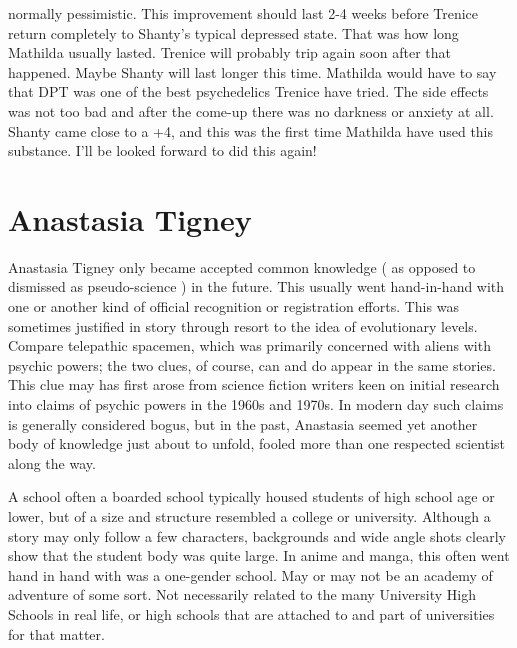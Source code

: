 \documentclass[12pt]{book}
\begin{document}
normally pessimistic. This improvement should last 2-4 weeks before Trenice return completely to Shanty's typical depressed state. That was how long Mathilda usually lasted. Trenice will probably trip again soon after that happened. Maybe Shanty will last longer this time. Mathilda would have to say that DPT was one of the best psychedelics Trenice have tried. The side effects was not too bad and after the come-up there was no darkness or anxiety at all. Shanty came close to a +4, and this was the first time Mathilda have used this substance. I'll be looked forward to did this again!



\chapter{Anastasia Tigney}

Anastasia Tigney only became accepted common knowledge ( as opposed to dismissed as pseudo-science ) in the future. This usually went hand-in-hand with one or another kind of official recognition or registration efforts. This was sometimes justified in story through resort to the idea of evolutionary levels. Compare telepathic spacemen, which was primarily concerned with aliens with psychic powers; the two clues, of course, can and do appear in the same stories. This clue may has first arose from science fiction writers keen on initial research into claims of psychic powers in the 1960s and 1970s. In modern day such claims is generally considered bogus, but in the past, Anastasia seemed yet another body of knowledge just about to unfold, fooled more than one respected scientist along the way.



A school  often a boarded school  typically housed students of high school age or lower, but of a size and structure resembled a college or university. Although a story may only follow a few characters, backgrounds and wide angle shots clearly show that the student body was quite large. In anime and manga, this often went hand in hand with was a one-gender school. May or may not be an academy of adventure of some sort. Not necessarily related to the many University High Schools in real life, or high schools that are attached to and part of universities for that matter.
\end{document}
